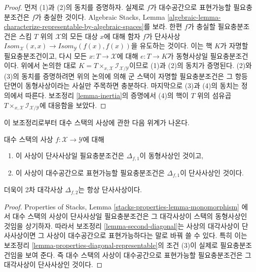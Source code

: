 \begin{proof}
먼저 (1)과 (2)의 동치를 증명하자. 실제로 $f$가 대수공간으로
표현가능할 필요충분조건은 $f$가 충실한 것이다. Algebraic Stacks, Lemma
\ref{algebraic-lemma-characterize-representable-by-algebraic-spaces}를 보라.
한편 $f$가 충실할 필요충분조건은 스킴 $T$ 위의 $\mathcal{X}$의 모든
대상 $x$에 대해 함자 $f$가 단사사상
$\mathit{Isom}_\mathcal{X}(x, x) \to
\mathit{Isom}_\mathcal{Y}(f(x), f(x))$을 유도하는 것이다.
이는 핵 $K$가 자명할 필요충분조건이고, 다시 모든
$x : T \to \mathcal{X}$에 대해 $e : T \to K$가 동형사상일
필요충분조건이다. 위에서 논의한 대로
$K = T \times_{x, \mathcal{X}} \mathcal{I}_{\mathcal{X}/\mathcal{Y}}$이므로
(1)과 (2)의 동치가 증명된다. (2)와 (3)의 동치를 증명하려면 위의 논의에
의해 군 스택이 자명할 필요충분조건은 그 항등 단면이 동형사상이라는
사실만 주목하면 충분하다. 마지막으로 (3)과 (4)의 동치는 정의에서 따른다.
보조정리 \ref{lemma-inertia}의 증명에서 (4)의 핵이 $T$ 위의 섬유곱
$T \times_{x, \mathcal{X}} \mathcal{I}_{\mathcal{X}/\mathcal{Y}}$에
대응함을 보았다.
\end{proof}

\noindent
이 보조정리로부터 대수 스택의 사상에 관한 다음 위계가 나온다.

\begin{lemma}
\label{lemma-hierarchy}
대수 스택의 사상 $f : \mathcal{X} \to \mathcal{Y}$에 대해
\begin{enumerate}
\item 이 사상이 단사사상일 필요충분조건은 $\Delta_{f, 1}$이 동형사상인 것이고,
\item 이 사상이 대수공간으로 표현가능할 필요충분조건은 $\Delta_{f, 1}$이
단사사상인 것이다.
\end{enumerate}
더욱이 2차 대각사상 $\Delta_{f, 2}$는 항상 단사사상이다.
\end{lemma}

\begin{proof}
Properties of Stacks, Lemma
\ref{stacks-properties-lemma-monomorphism}
에서 대수 스택의 사상이 단사사상일 필요충분조건은 그 대각사상이
스택의 동형사상인 것임을 상기하자. 따라서 보조정리
\ref{lemma-second-diagonal}는 사상의 대각사상이 단사사상이면 그 사상이
대수공간으로 표현가능하다는 말로 바꿔 쓸 수 있다. 특히 이는 보조정리
\ref{lemma-properties-diagonal-representable}의 조건 (3)이 실제로
필요충분조건임을 보여 준다. 즉 대수 스택의 사상이 대수공간으로
표현가능할 필요충분조건은 그 대각사상이 단사사상인 것이다.
\end{proof}

